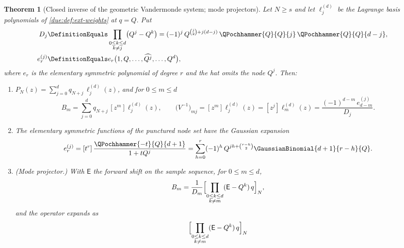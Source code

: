 \documentclass[11pt,oneside]{article}
\theoremstyle{plain}
\newtheorem{theorem}{Theorem}[section]
\theoremstyle{definition}
\theoremstyle{remark}
\newcommand{\upn}[1]{\RvachevUp_{#1}}
\newcommand{\Qq}{Q}                                         %
\newcommand{\qn}[1]{q_{#1}}                                 %
\begin{document}
\begin{theorem}[Closed inverse of the geometric Vandermonde system; mode projectors]
\label{due:thm:rec-inverse}
Let $N\ge s$ and let $\ell^{(d)}_{j}$ be the Lagrange basis polynomials of
\cref{due:def:ext-weights} at $q=\Qq$.  Put
\begin{equation}
\begin{aligned}
 D_{j}&\DefinitionEquals\prod_{\substack{0\le k\le d\\k\ne j}}\bigl(\Qq^{j}-\Qq^{k}\bigr)
 =(-1)^{j}\,\Qq^{\binom{j}{2}+j(d-j)}\,
   \QPochhammer{\Qq}{\Qq}{j}\,\QPochhammer{\Qq}{\Qq}{d-j},\\
 e^{(j)}_{r}&\DefinitionEquals
 e_{r}\bigl(1,\Qq,\ldots,\widehat{\Qq^{j}},\ldots,\Qq^{d}\bigr),
\end{aligned}
 \label{due:eq:rec-Dj}
\end{equation}
where $e_{r}$ is the elementary symmetric polynomial of degree $r$ and the hat
omits the node $\Qq^{j}$.  Then:
\begin{enumerate}
\item\label{due:it:rec-lagrange}
 $P_{N}(z)=\sum_{j=0}^{d}\qn{N+j}\,\ell^{(d)}_{j}(z)$, and for $0\le m\le d$
 \begin{equation}
  B_{m}=\sum_{j=0}^{d}\qn{N+j}\,[z^{m}]\ell^{(d)}_{j}(z),
  \qquad
  \bigl(V^{-1}\bigr)_{mj}=[z^{m}]\ell^{(d)}_{j}(z)=[z^{j}]\ell^{(d)}_{m}(z)
  =\frac{(-1)^{d-m}\,e^{(j)}_{d-m}}{D_{j}}.
  \label{due:eq:rec-inverse-entries}
 \end{equation}
\item\label{due:it:rec-esym}
 The elementary symmetric functions of the punctured node set have the
 Gaussian expansion
 \begin{equation}
  e^{(j)}_{r}=[t^{r}]\,\frac{\QPochhammer{-t}{\Qq}{d+1}}{1+t\Qq^{j}}
  =\sum_{h=0}^{r}(-1)^{h}\,\Qq^{jh+\binom{r-h}{2}}
   \GaussianBinomial{d+1}{r-h}{\Qq}.
  \label{due:eq:rec-esym}
 \end{equation}
\item\label{due:it:rec-projector}
 (Mode projector.)  With $\mathsf E$ the forward shift on the sample sequence,
 for $0\le m\le d$,
 \begin{equation}
  B_{m}=\frac{1}{D_{m}}
  \Bigl[\prod_{\substack{0\le k\le d\\k\ne m}}(\mathsf E-\Qq^{k})\,q\Bigr]_{N},
  \label{due:eq:rec-projector}
 \end{equation}
 and the operator expands as
 \begin{equation}
  \Bigl[\prod_{\substack{0\le k\le d\\k\ne m}}(\mathsf E-\Qq^{k})\,q\Bigr]_{N}

\end{equation}
\end{enumerate}
\end{theorem}
\end{document}
